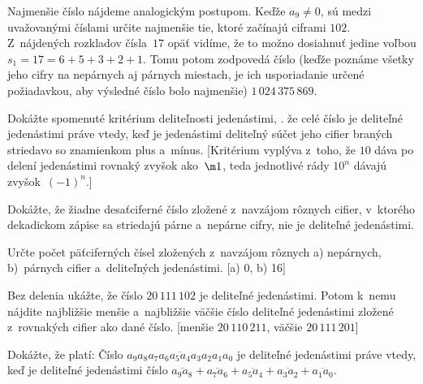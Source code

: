{Najmenšie číslo nájdeme analogickým postupom. Keďže $a_9\ne0$, sú medzi
uvažovanými číslami určite najmenšie tie, ktoré začínajú ciframi $102$. Z~nájdených
rozkladov čísla~$17$ opäť vidíme, že to možno dosiahnuť jedine voľbou $s_1=17=6+5+3+2+1$.
Tomu potom zodpovedá číslo (keďže poznáme všetky jeho cifry na nepárnych aj párnych miestach,
je ich usporiadanie určené požiadavkou, aby výsledné číslo bolo najmenšie)
$1\,024\,375\,869$.


Dokážte spomenuté kritérium deliteľnosti jedenástimi, \tj. že celé číslo je deliteľné jedenástimi
práve vtedy, keď je jedenástimi deliteľný súčet jeho cifier braných striedavo so znamienkom
plus a~mínus. [Kritérium vyplýva z~toho, že $10$ dáva po delení jedenástimi rovnaký zvyšok
ako~$\m1$, teda jednotlivé rády $10^n$ dávajú zvyšok~$(-1)^n$.]

Dokážte, že žiadne desaťciferné číslo zložené z~navzájom rôznych cifier,
v~ktorého dekadickom zápise sa striedajú párne a~nepárne cifry, nie je deliteľné
jedenástimi.

Určte počet päťciferných čísel zložených z~navzájom rôznych a) nepárnych,
b)~párnych cifier a~deliteľných jedenástimi. [a) 0, b) 16]

Bez delenia ukážte, že číslo $20\,111\,102$ je deliteľné jedenástimi. Potom k~nemu nájdite
najbližšie menšie a~najbližšie väčšie číslo deliteľné jedenástimi zložené
z~rovnakých cifier ako dané číslo. [menšie $20\,110\,211$, väčšie $20\,111\,201$]

Dokážte, že platí: Číslo
$\overline{a_9a_8a_7a_6a_5a_4a_3a_2a_1a_0}$ je deliteľné jedenástimi práve vtedy,
keď je deliteľné jedenástimi číslo
$\overline{a_9a_8}+\overline{a_7a_6}+\overline{a_5a_4}+\overline{a_3a_2}+\overline{a_1a_0}$.
}

